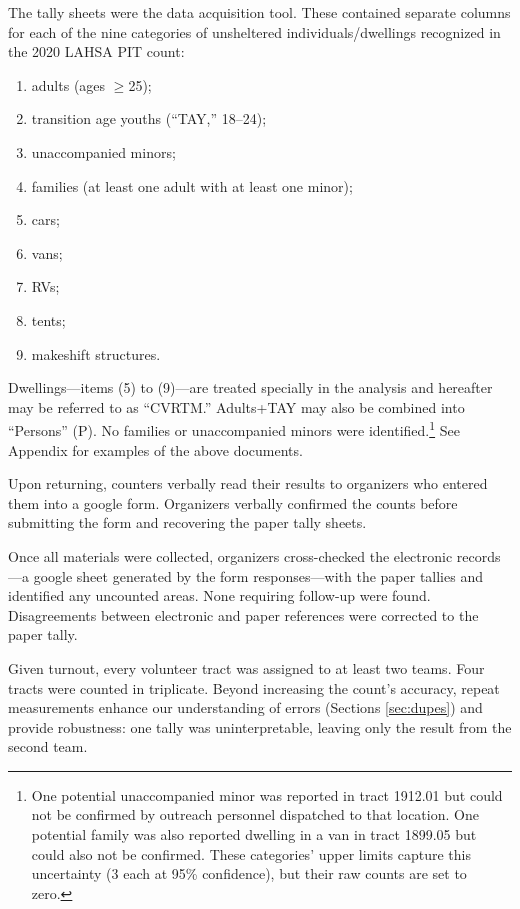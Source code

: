 \documentclass[11pt,twocolumn]{article}
\def\bfr{\bf\color{red}}
\def\Count{count}
\begin{document}
The tally sheets were the data acquisition tool. These contained separate columns for each of the 
nine categories of unsheltered individuals/dwellings recognized in the 2020 LAHSA PIT count: 
\begin{enumerate}
	\item adults (ages $\geq$25);
	\item transition age youths (``TAY,'' 18--24);
	\item unaccompanied minors;
	\item families (at least one adult with at least one minor); 
	\item cars;
	\item vans;
	\item RVs;
	\item tents;
	\item makeshift structures.
\end{enumerate}
Dwellings---items (5) to (9)---are treated specially in the analysis and hereafter 
may be referred to as ``CVRTM.'' Adults+TAY may also be combined into 
``Persons'' (P). No families or unaccompanied minors were identified.\footnote{
One potential unaccompanied minor was reported in tract 1912.01 but could not be confirmed by outreach
personnel dispatched to that location. One potential family was also reported dwelling in a van in
tract 1899.05 but could also not be confirmed. These categories' upper limits capture this 
uncertainty (3 each at 95\% confidence), but their raw counts are set to zero.} See Appendix for examples
of the above documents.

Upon returning, counters verbally read their results to organizers who entered them into a google 
form. Organizers verbally confirmed the counts before submitting the form and recovering the
paper tally sheets.

Once all materials were collected, organizers cross-checked the electronic records---a
google sheet generated by the form responses---with the paper tallies and identified any 
uncounted areas. None requiring follow-up were found. Disagreements between electronic 
and paper references were corrected to the paper tally. 

Given turnout, every volunteer tract was assigned to at least two teams. Four tracts were 
counted in triplicate. Beyond increasing the \Count's accuracy, repeat measurements 
enhance our understanding of errors (Sections \ref{sec:dupes}) and provide robustness: one 
tally was uninterpretable, leaving only the result from the second team.
\end{document}
